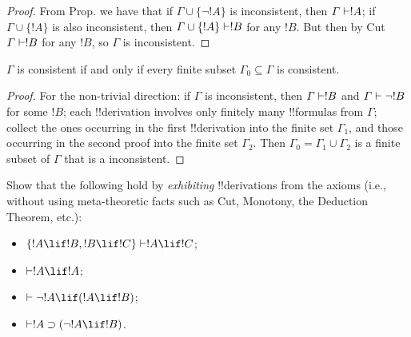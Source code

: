 \documentclass[../../include/open-logic-section]{subfiles}
\begin{document}
\begin{proof}
  From Prop.  we have that if $\Gamma \cup\{\lnot
  !A\}$ is inconsistent, then $\Gamma \Proves !A$; if $\Gamma
  \cup\{ !A\}$ is also inconsistent, then $\Gamma \cup\{
  !A\} \Proves !B$ for any $!B$. But then by Cut $\Gamma
  \Proves !B$ for any $!B$, so $\Gamma$ is inconsistent.
\end{proof}

\begin{prop}
  $\Gamma$ is consistent if and only if every finite subset
  $\Gamma_0\subseteq \Gamma$ is consistent.
\end{prop}
\begin{proof}
 For the non-trivial direction: if $\Gamma$ is inconsistent, then
 $\Gamma \Proves !B$ and $\Gamma \Proves \lnot !B$ for some
$!B$; each !!{derivation} involves only finitely many !!{formula}s from
$\Gamma$;
collect the ones occurring in the first !!{derivation} into the finite set
$\Gamma_1$, and those occurring in the second proof into the finite
 set $\Gamma_2$. Then $\Gamma_0 = \Gamma_1 \cup \Gamma_2$ is a finite
 subset of $\Gamma$ that is a inconsistent.   
\end{proof}


\begin{prob}
Show that the following hold by \emph{exhibiting} !!{derivation}s from the
axioms (i.e., without using meta-theoretic facts such as Cut,
  Monotony, the Deduction Theorem, etc.):
  \begin{itemize}
  \item $\{!A\lif !B, !B\lif !C\} \Proves !A\lif !C$;
  \item $\Proves !A \lif !A$;
  \item $\Proves \lnot !A \lif (!A \lif !B)$;
  \item $\Proves !A \supset (\lnot !A \lif !B)$.
 \end{itemize}
\end{prob}
\end{document}
